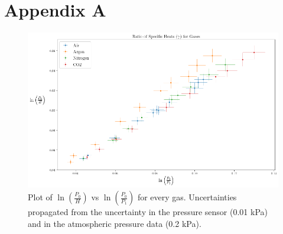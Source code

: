 \documentclass[12pt]{article}
\begin{document}
\newpage
\appendix
\section{Appendix A}\label{sec:AppendixA}
\begin{figure}[h]
	\includegraphics[width=1\textwidth]{Figures/Clement_All_points}
	\caption{Plot of $\ln \left( \frac{{P_0}}{{H}} \right)$ vs $\ln \left( \frac{{P_0}}{{P_1}} \right)$ for every gas. Uncertainties propagated from the uncertainty in the pressure sensor (0.01 kPa) and in the atmospheric pressure data (0.2 kPa).}
\end{figure}
\end{document}
